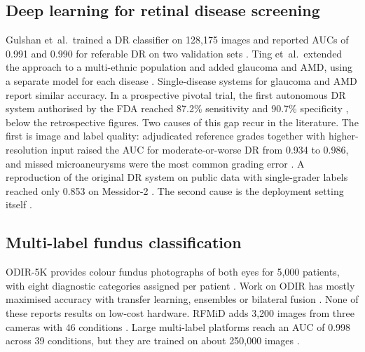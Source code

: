 \documentclass[a4paper,fleqn]{cas-sc}
\begin{document}
\subsection{Deep learning for retinal disease screening}
Gulshan et~al.\ trained a DR classifier on 128,175 images and reported AUCs
of 0.991 and 0.990 for referable DR on two validation sets
\cite{gulshan2016development}. Ting et~al.\ extended the approach to a
multi-ethnic population and added glaucoma and AMD, using a separate model
for each disease \cite{ting2017development}. Single-disease systems for
glaucoma \cite{li2018efficacy} and AMD \cite{burlina2017automated} report
similar accuracy. In a prospective pivotal trial, the first autonomous DR
system authorised by the FDA reached 87.2\% sensitivity and 90.7\%
specificity \cite{abramoff2018pivotal}, below the retrospective figures.
Two causes of this gap recur in the literature. The first is image and
label quality: adjudicated reference grades together with higher-resolution
input raised the AUC for moderate-or-worse DR from 0.934 to 0.986, and
missed microaneurysms were the most common grading error
\cite{krause2018grader}. A reproduction of the original DR system on public
data with single-grader labels reached only 0.853 on Messidor-2
\cite{voets2019reproduction}. The second cause is the deployment setting
itself \cite{beede2020human,lee2021multicenter}.

\subsection{Multi-label fundus classification}
ODIR-5K provides colour fundus photographs of both eyes for 5,000
patients, with eight diagnostic categories assigned per patient
\cite{li2021benchmark,odir2019challenge}. Work on ODIR has mostly
maximised accuracy with transfer learning, ensembles or bilateral fusion
\cite{islam2019source,wang2020multilabel,gour2021multiclass,he2021multilabel,sun2022efficientnet,wang2024tlccl}.
None of these reports results on low-cost hardware. RFMiD adds 3,200
images from three cameras with 46 conditions \cite{pachade2021retinal}.
Large multi-label platforms reach an AUC of 0.998 across 39 conditions, but
they are trained on about 250,000 images \cite{cen2021automatic}.
\end{document}
